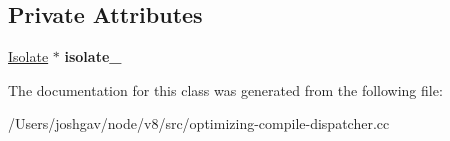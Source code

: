 \subsection*{Private Attributes}
\begin{DoxyCompactItemize}
\item 
\hyperlink{classv8_1_1internal_1_1_isolate}{Isolate} $\ast$ {\bfseries isolate\+\_\+}\hypertarget{classv8_1_1internal_1_1_optimizing_compile_dispatcher_1_1_compile_task_a259f45fb0692cf3ef808e7a126aea6c5}{}\label{classv8_1_1internal_1_1_optimizing_compile_dispatcher_1_1_compile_task_a259f45fb0692cf3ef808e7a126aea6c5}

\end{DoxyCompactItemize}


The documentation for this class was generated from the following file\+:\begin{DoxyCompactItemize}
\item 
/\+Users/joshgav/node/v8/src/optimizing-\/compile-\/dispatcher.\+cc\end{DoxyCompactItemize}
